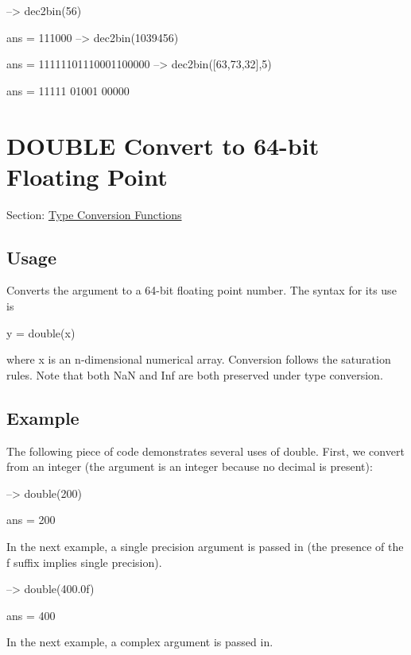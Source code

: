 \begin{DoxyVerbInclude}
--> dec2bin(56)

ans = 
111000
--> dec2bin(1039456)

ans = 
11111101110001100000
--> dec2bin([63,73,32],5)

ans = 
11111
01001
00000
\end{DoxyVerbInclude}
 \hypertarget{typecast_double}{}\section{D\-O\-U\-B\-L\-E Convert to 64-\/bit Floating Point}\label{typecast_double}
Section\-: \hyperlink{sec_typecast}{Type Conversion Functions} \hypertarget{vtkwidgets_vtkxyplotwidget_Usage}{}\subsection{Usage}\label{vtkwidgets_vtkxyplotwidget_Usage}
Converts the argument to a 64-\/bit floating point number. The syntax for its use is \begin{DoxyVerb}   y = double(x)
\end{DoxyVerb}
 where {\ttfamily x} is an {\ttfamily n}-\/dimensional numerical array. Conversion follows the saturation rules. Note that both {\ttfamily Na\-N} and {\ttfamily Inf} are both preserved under type conversion. \hypertarget{variables_struct_Example}{}\subsection{Example}\label{variables_struct_Example}
The following piece of code demonstrates several uses of {\ttfamily double}. First, we convert from an integer (the argument is an integer because no decimal is present)\-:


\begin{DoxyVerbInclude}
--> double(200)

ans = 
 200 
\end{DoxyVerbInclude}


In the next example, a single precision argument is passed in (the presence of the {\ttfamily f} suffix implies single precision).


\begin{DoxyVerbInclude}
--> double(400.0f)

ans = 
 400 
\end{DoxyVerbInclude}


In the next example, a complex argument is passed in.


